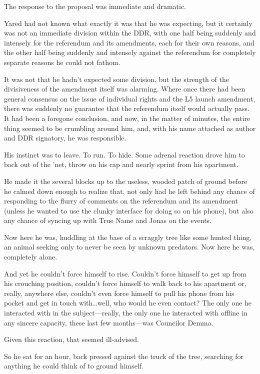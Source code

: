 \noindent The response to the proposal was immediate and dramatic.

Yared had not known what exactly it was that he was expecting, but it certainly was not an immediate division within the DDR, with one half being suddenly and intensely for the referendum and its amendments, each for their own reasons, and the other half being suddenly and intensely against the referendum for completely separate reasons he could not fathom.

It was not that he hadn't expected some division, but the strength of the divisiveness of the amendment itself was alarming. Where once there had been general consensus on the issue of individual rights and the L5 launch amendment, there was suddenly no guarantee that the referendum itself would actually pass. It had been a foregone conclusion, and now, in the matter of minutes, the entire thing seemed to be crumbling around him, and, with his name attached as author and DDR signatory, he was responsible.

His instinct was to leave. To run. To hide. Some adrenal reaction drove him to back out of the 'net, throw on his cap and nearly sprint from his apartment.

He made it the several blocks up to the useless, wooded patch of ground before he calmed down enough to realize that, not only had he left behind any chance of responding to the flurry of comments on the referendum and its amendment (unless he wanted to use the clunky interface for doing so on his phone), but also any chance of syncing up with True Name and Jonas on the events.

Now here he was, huddling at the base of a scraggly tree like some hunted thing, an animal seeking only to never be seen by unknown predators. Now here he was, completely alone.

And yet he couldn't force himself to rise. Couldn't force himself to get up from his crouching position, couldn't force himself to walk back to his apartment or, really, anywhere else, couldn't even force himself to pull his phone from his pocket and get in touch with\ldots well, who would he even contact? The only one he interacted with in the subject---really, the only one he interacted with offline in any sincere capacity, these last few months---was Councilor Demma.

Given this reaction, that seemed ill-advised.

So he sat for an hour, back pressed against the truck of the tree, searching for anything he could think of to ground himself.

